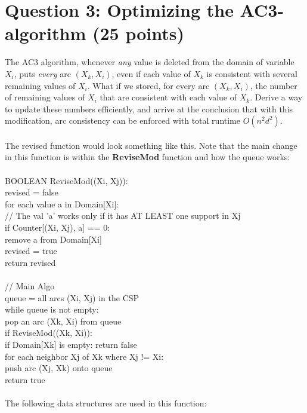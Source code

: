 \documentclass[11pt]{article}
\newcommand{\question}[1]{\section*{\normalsize #1}}
\begin{document}
    \newpage


    \question{Question 3: Optimizing the AC3-algorithm (25 points)}
    The AC3 algorithm, whenever \textit{any} value is deleted from the domain of variable $X_i$, puts \textit{every} arc $(X_k, X_i)$, even if each value of $X_k$ is consistent with several remaining values of $X_i$. What if we stored, for every arc $(X_k, X_i)$, the number of remaining values of $X_i$ that are consistent with each value of $X_k$. Derive a way to update these numbers efficiently, and arrive at the conclusion that with this modification, arc consistency can be enforced with total runtime $O(n^2d^2)$.\newline
    \\
    \\
    The revised function would look something like this. Note that the main change in this function is within the \textbf{ReviseMod} function and how the queue works: \\
    \\
    BOOLEAN ReviseMod((Xi, Xj)):\\
    \indent revised = false\\
    \indent for each value a in Domain[Xi]:\\
    \indent \indent // The val 'a' works only if it has AT LEAST one support in Xj\\
    \indent \indent if Counter[(Xi, Xj), a] == 0:\\
    \indent \indent \indent remove a from Domain[Xi]\\
    \indent \indent \indent revised = true\\
    \indent return revised\\
\\
    // Main Algo\\
    queue = all arcs (Xi, Xj) in the CSP\\
    while queue is not empty:\\
    \indent pop an arc (Xk, Xi) from queue\\
    \indent if ReviseMod((Xk, Xi)):\\
    \indent \indent if Domain[Xk] is empty: return false\\
    \indent \indent for each neighbor Xj of Xk where Xj != Xi:\\
    \indent \indent \indent push arc (Xj, Xk) onto queue\\
    return true\\
    \\
    The following data structures are used in this function: \\
\end{document}
